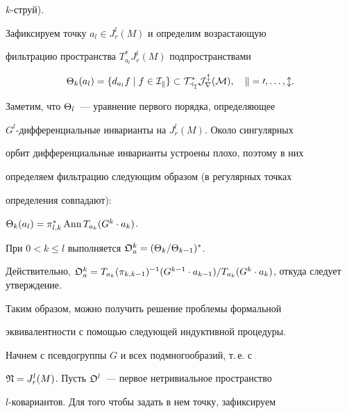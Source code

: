 $k$-струй).


Зафиксируем точку $a_l\in J^l_r(M)$ и определим возрастающую


фильтрацию пространства $T_{a_l}^*J^l_r(M)$ подпространствами


$$


\T_k(a_l)=\{d_{a_l}f\mid f\in\cal{I}_k\}\subset


T_{a_l}^*J^l_r(M),\quad k=0,\dotsc,l.


$$





Заметим, что $\Theta_l$~--- уравнение первого порядка, определяющее


$G^l$-дифференциальные инварианты на $J^l_r(M)$. Около сингулярных


орбит дифференциальные инварианты устроены плохо, поэтому в них


определяем фильтрацию следующим образом (в регулярных точках


определения совпадают):


$\Theta_k(a_l)=\pi_{l,k}^*\operatorname{Ann} T_{a_k}(G^k\cdot a_k)$.








\begin{prop}


При $0<k\le l$ выполняется $\frak{O}^k_a=(\Theta_k/\Theta_{k-1})^*$.


\end{prop}





\begin{pf}


Действительно, $\frak{O}^k_a=T_{a_k}(\pi_{k,k-1})^{-1}(G^{k-1}\cdot


a_{k-1})/T_{a_k}(G^k\cdot a_k)$, откуда следует утверждение.


\end{pf}





Таким образом, можно получить решение проблемы формальной


эквивалентности с помощью следующей индуктивной процедуры.


Начнем с псевдогруппы $G$ и всех подмногообразий, т.\,е. с


$\frak{N}=J^l_r(M)$. Пусть $\frak{O}^l$~--- первое нетривиальное пространство


$l$-ковариантов. Для того чтобы задать в нем точку, зафиксируем


